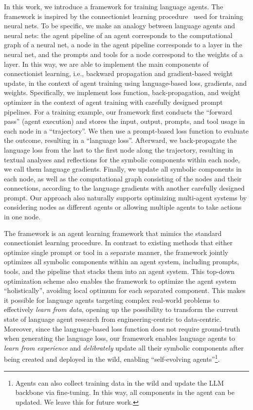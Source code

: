 In this work, we introduce a \textit{\baby} framework for training language agents. The \baby framework is inspired by the connectionist learning procedure~\citep{hinton1990connectionist} used for training neural nets. To be specific, we make an analogy between language agents and neural nets: the agent pipeline of an agent corresponds to the computational graph of a neural net, a node in the agent pipeline corresponds to a layer in the neural net, and the prompts and tools for a node correspond to the weights of a layer. In this way, we are able to implement the main components of connectionist learning, i.e., backward propagation and gradient-based weight update, in the context of agent training using language-based loss, gradients, and weights. Specifically, we implement loss function, back-propagation, and weight optimizer in the context of agent training with carefully designed prompt pipelines. For a training example, our framework first conducts the ``forward pass'' (agent execution) and stores the input, output, prompts, and tool usage in each node in a ``trajectory''. We then use a prompt-based loss function to evaluate the outcome, resulting in a ``language loss''. Afterward, we back-propagate the language loss from the last to the first node along the trajectory, resulting in textual analyses and reflections for the symbolic components within each node, we call them language gradients. Finally, we update all symbolic components in each node, as well as the computational graph consisting of the nodes and their connections, according to the language gradients with another carefully designed prompt. Our approach also naturally supports optimizing multi-agent systems by considering nodes as different agents or allowing multiple agents to take actions in one node.

The \baby framework is an agent learning framework that mimics the standard connectionist learning procedure. In contrast to existing methods that either optimize single prompt or tool in a separate manner, the \baby framework jointly optimizes all symbolic components within an agent system, including prompts, tools, and the pipeline that stacks them into an agent system. This top-down optimization scheme also enables the \baby framework to optimize the agent system ``holistically'', avoiding local optimum for each separated component. This makes it possible for language agents targeting complex real-world problems to effectively \textit{learn from data}, opening up the possibility to transform the current state of language agent research from engineering-centric to data-centric. Moreover, since the language-based loss function does not require ground-truth when generating the language loss, our framework enables language agents to \textit{learn from experience} and \textit{delibrately} update all their symbolic components after being created and deployed in the wild, enabling ``self-evolving agents''\footnote{Agents can also collect training data in the wild and update the LLM backbone via fine-tuning. In this way, all components in the agent can be updated. We leave this for future work.}.

